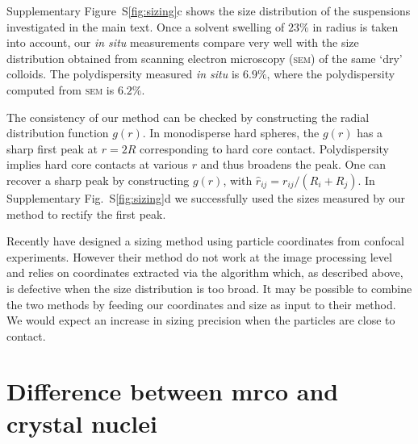 \documentclass[prl,twocolumn,notitlepage]{revtex4-1}
\begin{document}
Supplementary Figure~S\ref{fig:sizing}c shows the size distribution of the suspensions investigated in the main text. Once a solvent swelling of $23\%$ in radius is taken into account, our \emph{in situ} measurements compare very well with the size distribution obtained from scanning electron microscopy (\textsc{sem}) of the same `dry' colloids. The polydispersity measured \emph{in situ} is $6.9\%$, where the polydispersity computed from \textsc{sem} is $6.2\%$.

The consistency of our method can be checked by constructing the radial distribution function $g(r)$. In monodisperse hard spheres, the $g(r)$ has a sharp first peak at $r=2R$ corresponding to hard core contact. Polydispersity implies hard core contacts at various $r$ and thus broadens the peak. One can recover a sharp peak by constructing $g(\hat{r})$, with $\hat{r}_{ij} = r_{ij}/(R_i+R_j)$. In Supplementary Fig.~S\ref{fig:sizing}d we successfully used the sizes measured by our method to rectify the first peak.

Recently \citet{Kurita2011,Kurita2011b} have designed a sizing method using particle coordinates from confocal experiments. However their method do not work at the image processing level and relies on coordinates extracted via the \citet{Crocker1996} algorithm which, as described above, is defective when the size distribution is too broad. It may be possible to combine the two methods by feeding our coordinates and size as input to their method. We would expect an increase in sizing precision when the particles are close to contact.


\section*{Difference between {\sc mrco} and crystal nuclei}
\end{document}
